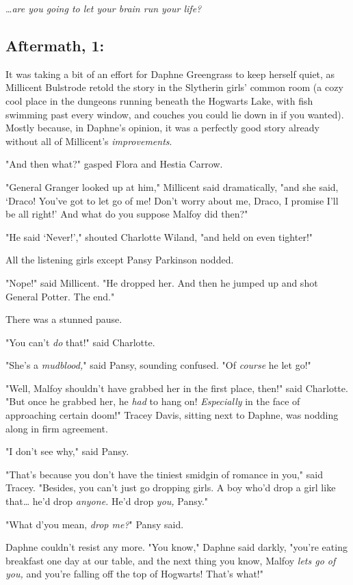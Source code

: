 {\ldots}\emph{are you going to let your brain run your life?}
\sbreak
\vspace{-2\baselineskip}
\subsection{Aftermath, 1:}

It was taking a bit of an effort for Daphne Greengrass to keep herself quiet, 
as Millicent Bulstrode retold the story in the Slytherin girls' common room (a 
cozy cool place in the dungeons running beneath the Hogwarts Lake, with fish 
swimming past every window, and couches you could lie down in if you wanted). 
Mostly because, in Daphne's opinion, it was a perfectly good story already 
without all of Millicent's \emph{improvements}.

"And then what?" gasped Flora and Hestia Carrow.

"General Granger looked up at him," Millicent said dramatically, "and she said, 
`Draco! You've got to let go of me! Don't worry about me, Draco, I promise I'll 
be all right!' And what do you suppose Malfoy did then?"

"He said `Never!'," shouted Charlotte Wiland, "and held on even tighter!"

All the listening girls except Pansy Parkinson nodded.

"Nope!" said Millicent. "He dropped her. And then he jumped up and shot General 
Potter. The end."

There was a stunned pause.

"You can't \emph{do} that!" said Charlotte.

"She's a \emph{mudblood,}" said Pansy, sounding confused. "Of \emph{course} he 
let go!"

"Well, Malfoy shouldn't have grabbed her in the first place, then!" said 
Charlotte. "But once he grabbed her, he \emph{had} to hang on! 
\emph{Especially} in the face of approaching certain doom!" Tracey Davis, 
sitting next to Daphne, was nodding along in firm agreement.

"I don't see why," said Pansy.

"That's because you don't have the tiniest smidgin of romance in you," said 
Tracey. "Besides, you can't just go dropping girls. A boy who'd drop a girl 
like that{\ldots} he'd drop \emph{anyone.} He'd drop \emph{you,} Pansy."

"What d'you mean, \emph{drop me?}" Pansy said.

Daphne couldn't resist any more. "You know," Daphne said darkly, "you're eating 
breakfast one day at our table, and the next thing you know, Malfoy \emph{lets 
go of you,} and you're falling off the top of Hogwarts! That's what!"

